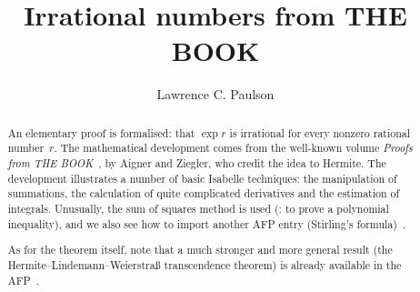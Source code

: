 \documentclass[11pt,a4paper]{report}
\begin{document}
\title{Irrational numbers from THE BOOK}
\author{Lawrence C. Paulson}
\maketitle

\begin{abstract}
An elementary proof is formalised: that $\exp r$ is irrational for every nonzero rational number~$r$. The mathematical development comes from the well-known volume \emph{Proofs from THE BOOK}~\cite[pp.--2]{aigner-proofs}, by Aigner and Ziegler, who credit the idea to Hermite. The development illustrates a number of basic Isabelle techniques: the manipulation of summations, the calculation of quite complicated derivatives and the estimation of integrals. Unusually, the sum of squares method is used (: to prove a polynomial inequality), and we also see how to import another AFP entry (Stirling's formula)~\cite{Stirling_Formula-AFP}.

As for the theorem itself, note that a much stronger and more general result (the Hermite--Lindemann--Weierstra\ss{} transcendence theorem) is already available in the AFP~\cite{Hermite_Lindemann-AFP}.
\end{abstract}

\tableofcontents





\end{document}
